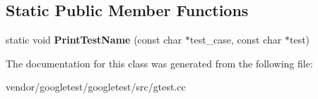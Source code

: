 \subsection*{Static Public Member Functions}
\begin{DoxyCompactItemize}
\item 
\mbox{\label{classtesting_1_1internal_1_1_pretty_unit_test_result_printer_a5b60a9aed1db02837b11450f6e8d0f71}} 
static void {\bfseries Print\+Test\+Name} (const char $\ast$test\+\_\+case, const char $\ast$test)
\end{DoxyCompactItemize}


The documentation for this class was generated from the following file\+:\begin{DoxyCompactItemize}
\item 
vendor/googletest/googletest/src/gtest.\+cc\end{DoxyCompactItemize}
